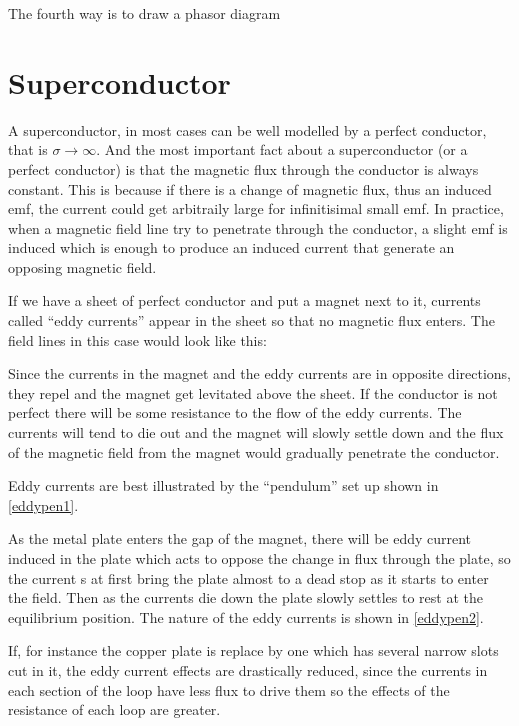 \documentclass[english,a4paper,12pt]{report}
\begin{document}
The fourth way is to draw a phasor diagram 







\section{Superconductor}

A superconductor, in most cases can be well modelled by a perfect conductor, that is \(\sigma \rightarrow \infty\). And the most important fact about a superconductor (or a perfect conductor) is that the magnetic flux through the conductor is always constant. This is because if there is a change of magnetic flux, thus an induced emf, the current could get arbitraily large for infinitisimal small emf. In practice, when a magnetic field line try to penetrate through the conductor, a slight emf is induced which is enough to produce an induced current that generate an opposing magnetic field.

If we have a sheet of perfect conductor and put a magnet next to it, currents called ``eddy currents'' appear in the sheet so that no magnetic flux enters. The field lines in this case would look like this:


Since the currents in the magnet and the eddy currents are in opposite directions, they repel and the magnet get levitated above the sheet. If the conductor is not perfect there will be some resistance to the flow of the eddy currents. The currents will tend to die out and the magnet will slowly settle down and the flux of the magnetic field from the magnet would gradually penetrate the conductor.

Eddy currents are best illustrated by the ``pendulum'' set up shown in \cref{eddypen1}.


As the metal plate enters the gap of the magnet, there will be eddy current induced in the plate which acts to oppose the change in flux through the plate, so the current s at first bring the plate almost to a dead stop as it starts to enter the field. Then as the currents die down the plate slowly settles to rest at the equilibrium position. The nature of the eddy currents is shown in \cref{eddypen2}.  

If, for instance the copper plate is replace by one which has several narrow slots cut in it, the eddy current effects are drastically reduced, since the currents in each section of the loop have less flux to drive them so the effects of the resistance of each loop are greater. 
\end{document}
